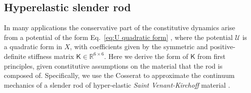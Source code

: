 \subsection{Hyperelastic slender rod} \label{sec:The hyperelastic Cosserat rod model}

In many applications the conservative part of the constitutive dynamics arise from a potential of the form Eq.~\ref{eq:U quadratic form} \citep{NonlinearProblemsElasticity2005, wangOptimalControlSoft2021a, gargSlenderBodyTheory2022, tillRealtimeDynamicsSoft2019}, where the potential $\mathcal{U}$ is a quadratic form in $X$, with coefficients given by the symmetric and positive-definite stiffness matrix $\mathsf{K} \in \mathbb{R}^{6 \times 6}$. Here we derive the form of $\mathsf{K}$ from first principles, given constitutive assumptions on the material that the rod is composed of. Specifically, we use the Cosserat to approximate the continuum mechanics of a slender rod of hyper-elastic \textit{Saint Venant-Kirchoff} material \cite{basarNonlinearContinuumMechanics2013}.

